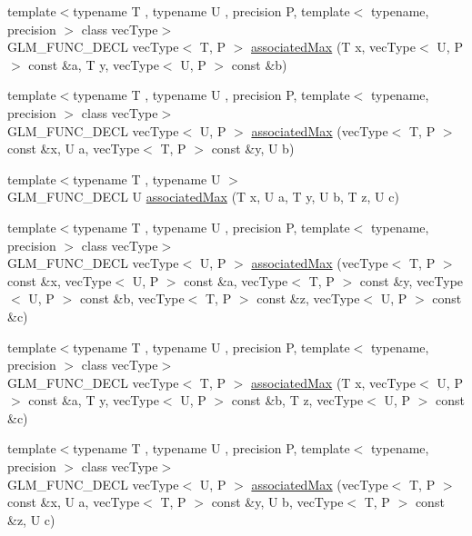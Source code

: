 \begin{DoxyCompactItemize}
\item 
{\footnotesize template$<$typename T , typename U , precision P, template$<$ typename, precision $>$ class vec\+Type$>$ }\\G\+L\+M\+\_\+\+F\+U\+N\+C\+\_\+\+D\+E\+C\+L vec\+Type$<$ T, P $>$ \hyperlink{group__gtx__associated__min__max_ga62ca63cca6b21387b8a25474f441a869}{associated\+Max} (T x, vec\+Type$<$ U, P $>$ const \&a, T y, vec\+Type$<$ U, P $>$ const \&b)
\item 
{\footnotesize template$<$typename T , typename U , precision P, template$<$ typename, precision $>$ class vec\+Type$>$ }\\G\+L\+M\+\_\+\+F\+U\+N\+C\+\_\+\+D\+E\+C\+L vec\+Type$<$ U, P $>$ \hyperlink{group__gtx__associated__min__max_ga5364520173815b66a9d9e452c38bf312}{associated\+Max} (vec\+Type$<$ T, P $>$ const \&x, U a, vec\+Type$<$ T, P $>$ const \&y, U b)
\item 
{\footnotesize template$<$typename T , typename U $>$ }\\G\+L\+M\+\_\+\+F\+U\+N\+C\+\_\+\+D\+E\+C\+L U \hyperlink{group__gtx__associated__min__max_gaec891e363d91abbf3a4443cf2f652209}{associated\+Max} (T x, U a, T y, U b, T z, U c)
\item 
{\footnotesize template$<$typename T , typename U , precision P, template$<$ typename, precision $>$ class vec\+Type$>$ }\\G\+L\+M\+\_\+\+F\+U\+N\+C\+\_\+\+D\+E\+C\+L vec\+Type$<$ U, P $>$ \hyperlink{group__gtx__associated__min__max_ga065a0c1eb7837118ef79be88dfd78487}{associated\+Max} (vec\+Type$<$ T, P $>$ const \&x, vec\+Type$<$ U, P $>$ const \&a, vec\+Type$<$ T, P $>$ const \&y, vec\+Type$<$ U, P $>$ const \&b, vec\+Type$<$ T, P $>$ const \&z, vec\+Type$<$ U, P $>$ const \&c)
\item 
{\footnotesize template$<$typename T , typename U , precision P, template$<$ typename, precision $>$ class vec\+Type$>$ }\\G\+L\+M\+\_\+\+F\+U\+N\+C\+\_\+\+D\+E\+C\+L vec\+Type$<$ T, P $>$ \hyperlink{group__gtx__associated__min__max_ga553431a468e251623408603bcb51c9cb}{associated\+Max} (T x, vec\+Type$<$ U, P $>$ const \&a, T y, vec\+Type$<$ U, P $>$ const \&b, T z, vec\+Type$<$ U, P $>$ const \&c)
\item 
{\footnotesize template$<$typename T , typename U , precision P, template$<$ typename, precision $>$ class vec\+Type$>$ }\\G\+L\+M\+\_\+\+F\+U\+N\+C\+\_\+\+D\+E\+C\+L vec\+Type$<$ U, P $>$ \hyperlink{group__gtx__associated__min__max_ga327136e6a568569c03a056f90814b656}{associated\+Max} (vec\+Type$<$ T, P $>$ const \&x, U a, vec\+Type$<$ T, P $>$ const \&y, U b, vec\+Type$<$ T, P $>$ const \&z, U c)

\end{DoxyCompactItemize}
